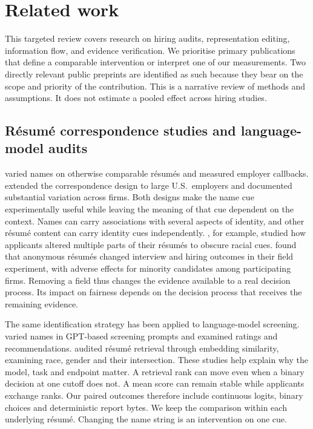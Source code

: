 \section{Related work}
\label{sec:related}

This targeted review covers research on hiring audits, representation editing, information flow, and evidence verification. We prioritise primary publications that define a comparable intervention or interpret one of our measurements. Two directly relevant public preprints are identified as such because they bear on the scope and priority of the contribution. This is a narrative review of methods and assumptions. It does not estimate a pooled effect across hiring studies.

\subsection{Résumé correspondence studies and language-model audits}

\citet{bertrand2004} varied names on otherwise comparable résumés and measured employer callbacks. \citet{kline2022} extended the correspondence design to large U.S.\ employers and documented substantial variation across firms. Both designs make the name cue experimentally useful while leaving the meaning of that cue dependent on the context. Names can carry associations with several aspects of identity, and other résumé content can carry identity cues independently. \citet{kang2016}, for example, studied how applicants altered multiple parts of their résumés to obscure racial cues. \citet{behaghel2015} found that anonymous résumés changed interview and hiring outcomes in their field experiment, with adverse effects for minority candidates among participating firms. Removing a field thus changes the evidence available to a real decision process. Its impact on fairness depends on the decision process that receives the remaining evidence.

The same identification strategy has been applied to language-model screening. \citet{armstrong2024} varied names in GPT-based screening prompts and examined ratings and recommendations. \citet{wilson2024} audited résumé retrieval through embedding similarity, examining race, gender and their intersection. These studies help explain why the model, task and endpoint matter. A retrieval rank can move even when a binary decision at one cutoff does not. A mean score can remain stable while applicants exchange ranks. Our paired outcomes therefore include continuous logits, binary choices and deterministic report bytes. We keep the comparison within each underlying résumé. Changing the name string is an intervention on one cue.

